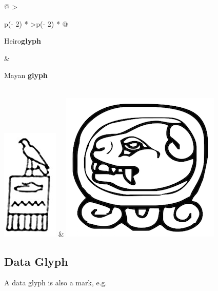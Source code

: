 \documentclass[
  letterpaper,
  DIV=11,
  numbers=noendperiod]{scrreprt}
\begin{document}
\begin{longtable}[]{@{}
  >{\raggedright\arraybackslash}p{(\columnwidth - 2\tabcolsep) * }
  >{\raggedleft\arraybackslash}p{(\columnwidth - 2\tabcolsep) * }@{}}
\toprule\noalign{}
\begin{minipage}[b]{\linewidth}\raggedright
Heiro\textbf{glyph}
\end{minipage} & \begin{minipage}[b]{\linewidth}\raggedleft
Mayan \textbf{glyph}
\end{minipage} \\
\midrule\noalign{}
\endhead
\bottomrule\noalign{}
\endlastfoot
\includegraphics{src/../images/hand.jpg} &
\includegraphics{src/../images/mayan-glyph.png} \\
\end{longtable}

\subsection*{Data Glyph}\label{data-glyph}

A data glyph is also a mark, e.g.
\end{document}
